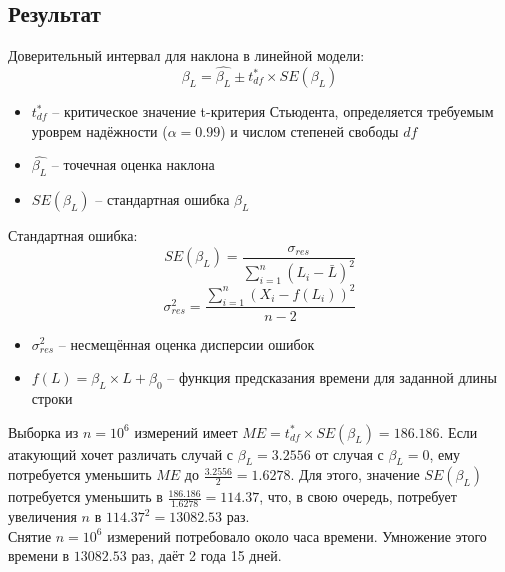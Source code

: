 \subsection{Результат}

Доверительный интервал для наклона в линейной модели: \\
\begin{equation}
\beta_L = \hat{\beta_L} \pm t^{*}_{df} \times SE(\beta_L)
\end{equation}
\begin{itemize}
\item $t^{*}_{df}$ -- критическое значение t-критерия Стьюдента, определяется
     требуемым уроврем надёжности ($\alpha = 0.99$) и числом степеней свободы $df$\\
\item $\hat{\beta_L}$ -- точечная оценка наклона\\
\item $SE(\beta_L)$ -- стандартная ошибка $\beta_L$
\end{itemize}

Стандартная ошибка: \\
\begin{equation}
SE(\beta_L) = \frac{ \sigma_{res} }{ \sum^n_{i=1} (L_i - \bar{L})^2 }
\end{equation}
\begin{equation}
\sigma_{res}^2 = \frac{ \sum^n_{i=1}  (X_i - f(L_i))^2 }{ n - 2 }
\end{equation}
\begin{itemize}
\item $\sigma_{res}^2$ -- несмещённая оценка дисперсии ошибок \\
\item $f(L) = \beta_{L} \times L + \beta_0$ -- функция предсказания времени для заданной длины строки \\
\end{itemize}

Выборка из $n = 10^6$ измерений имеет $ME = t^{*}_{df} \times SE(\beta_L) = 186.186$.
Если атакующий хочет различать случай с $\beta_L = 3.2556$ от случая с $\beta_L = 0$,
ему потребуется уменьшить $ME$ до $\frac{3.2556}{2} = 1.6278$. Для этого,
значение $SE(\beta_L)$ потребуется уменьшить в $\frac{186.186}{1.6278} = 114.37$,
что, в свою очередь, потребует увеличения $n$ в $114.37^2 = 13082.53$ раз.
\\[0.5cm]
Снятие $n = 10^6$ измерений потребовало около часа времени. Умножение этого времени в $13082.53$
раз, даёт 2 года 15 дней.

\clearpage
